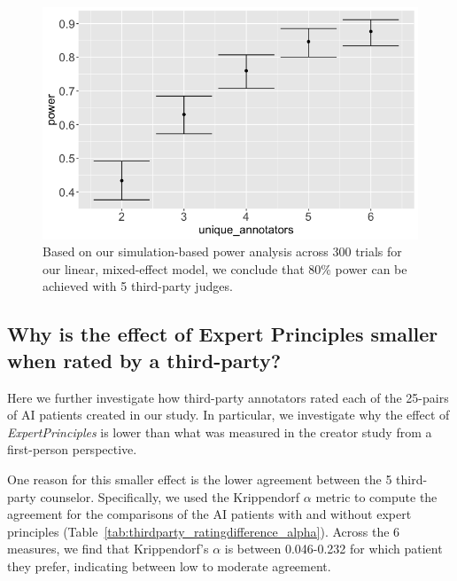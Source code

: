 \documentclass[11pt]{article}
\begin{document}
\begin{figure}[t]
    \centering
    \includegraphics[width=\columnwidth]{figures/power-analysis-300.png}
    \caption{Based on our simulation-based power analysis across 300 trials for our linear, mixed-effect model, we conclude that 80\% power can be achieved with 5 third-party judges.}
    \label{fig:power-analysis}
\end{figure}

\subsection{Why is the effect of Expert Principles smaller when rated by a third-party?} \label{appendix-sec:thirdparty-qual-analysis}

Here we further investigate how third-party annotators rated each of the 25-pairs of AI patients created in our study. In particular, we investigate why the effect of \textit{ExpertPrinciples} is lower than what was measured in the creator study from a first-person perspective. 

One reason for this smaller effect is the lower agreement between the 5 third-party counselor. Specifically, we used the Krippendorf $\alpha$ metric to compute the agreement for the comparisons of the AI patients with and without expert principles (Table~\ref{tab:thirdparty_ratingdifference_alpha}). Across the 6 measures, we find that Krippendorf's $\alpha$ is between 0.046-0.232 for which patient they prefer, indicating between low to moderate agreement. 
\end{document}
